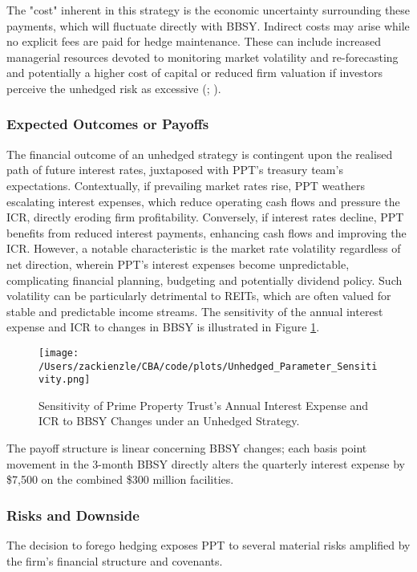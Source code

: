 \documentclass[11pt, a4paper, british]{article}
\begin{document}
The "cost" inherent in this strategy is the economic uncertainty surrounding these payments, which will fluctuate directly with BBSY. Indirect costs may arise while no explicit fees are paid for hedge maintenance. These can include increased managerial resources devoted to monitoring market volatility and re-forecasting and potentially a higher cost of capital or reduced firm valuation if investors perceive the unhedged risk as excessive (\cite{ss}; \cite{sr}).

\subsubsection{Expected Outcomes or Payoffs}
The financial outcome of an unhedged strategy is contingent upon the realised path of future interest rates, juxtaposed with PPT's treasury team's expectations. Contextually, if prevailing market rates rise, PPT weathers escalating interest expenses, which reduce operating cash flows and pressure the ICR, directly eroding firm profitability. Conversely, if interest rates decline, PPT benefits from reduced interest payments, enhancing cash flows and improving the ICR. However, a notable characteristic is the market rate volatility regardless of net direction, wherein PPT's interest expenses become unpredictable, complicating financial planning, budgeting and potentially dividend policy. Such volatility can be particularly detrimental to REITs, which are often valued for stable and predictable income streams. The sensitivity of the annual interest expense and ICR to changes in BBSY is illustrated in Figure \ref{fig:UnhedgedParameterSensitivity}.

\begin{figure}[H]
 \centering
 \texttt{[image: /Users/zackienzle/CBA/code/plots/Unhedged\_Parameter\_Sensitivity.png]} 
 \caption{Sensitivity of Prime Property Trust's Annual Interest Expense and ICR to BBSY Changes under an Unhedged Strategy.}
    \label{fig:UnhedgedParameterSensitivity}
\end{figure}

The payoff structure is linear concerning BBSY changes; each basis point movement in the 3-month BBSY directly alters the quarterly interest expense by \$7,500 on the combined \$300 million facilities.
\subsubsection{Risks and Downside}
The decision to forego hedging exposes PPT to several material risks amplified by the firm's financial structure and covenants. 
\end{document}
